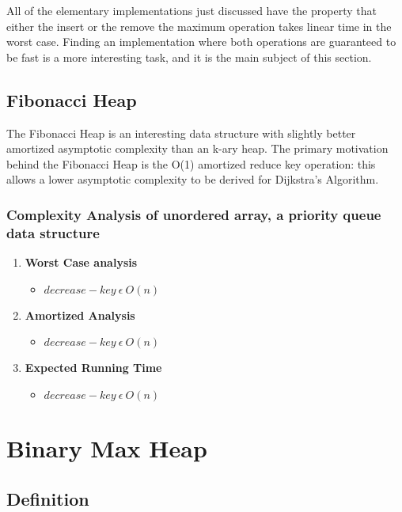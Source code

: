 \documentclass{article}
\begin{document}
  All of the elementary implementations just discussed have the property that either the insert or the remove the maximum operation takes linear time in the worst case. Finding an implementation where both operations are guaranteed to be fast is a more interesting task, and it is the main subject of this section.


  \subsection{Fibonacci Heap}
  The Fibonacci Heap is an interesting data structure with slightly better amortized asymptotic complexity than an k-ary heap. The  primary  motivation  behind  the  Fibonacci  Heap  is  the O(1)  amortized  reduce  key  operation:  this  allows  a  lower  asymptotic complexity to be derived for Dijkstra’s Algorithm.
  \subsubsection{Complexity Analysis of unordered array, a priority queue data structure}
  \begin{enumerate}
    \item \textbf{Worst Case analysis} \\
    \begin{itemize}
      \item $decrease-key ~\epsilon ~O(n)$
    \end{itemize}
    \item \textbf{Amortized Analysis}
    \begin{itemize}
      \item $decrease-key ~\epsilon ~O(n)$
    \end{itemize}
    \item \textbf{Expected Running Time}
    \begin{itemize}
      \item $decrease-key ~\epsilon ~O(n)$
    \end{itemize}

  \end{enumerate}

\section{Binary Max Heap}
\subsection{Definition}
\end{document}
